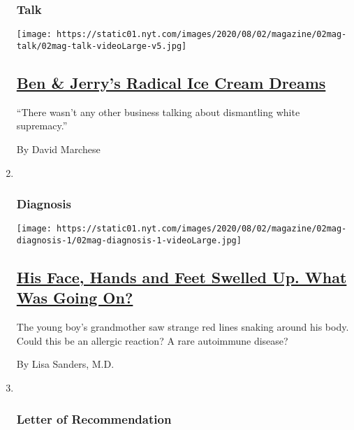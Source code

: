 \begin{enumerate}
{  \subsubsection{Talk}\label{talk-1}}

  \texttt{[image: https://static01.nyt.com/images/2020/08/02/magazine/02mag-talk/02mag-talk-videoLarge-v5.jpg]}

  \hypertarget{ben--jerrys-radical-ice-cream-dreams}{%
  \subsection{\texorpdfstring{\href{/interactive/2020/07/27/magazine/ben-jerry-interview.html}{Ben
  \& Jerry's Radical Ice Cream
  Dreams}}{Ben \& Jerry's Radical Ice Cream Dreams}}\label{ben--jerrys-radical-ice-cream-dreams}}

  ``There wasn't any other business talking about dismantling white
  supremacy.''

  By David Marchese
\item ~
  \hypertarget{diagnosis}{%
  \subsubsection{Diagnosis}\label{diagnosis}}

  \texttt{[image: https://static01.nyt.com/images/2020/08/02/magazine/02mag-diagnosis-1/02mag-diagnosis-1-videoLarge.jpg]}

  \hypertarget{his-face-hands-and-feet-swelled-up-what-was-going-on}{%
  \subsection{\texorpdfstring{\href{/2020/07/30/magazine/urticaria-multiforme.html}{His
  Face, Hands and Feet Swelled Up. What Was Going
  On?}}{His Face, Hands and Feet Swelled Up. What Was Going On?}}\label{his-face-hands-and-feet-swelled-up-what-was-going-on}}

  The young boy's grandmother saw strange red lines snaking around his
  body. Could this be an allergic reaction? A rare autoimmune disease?

  By Lisa Sanders, M.D.
\item ~
  \hypertarget{letter-of-recommendation}{%
  \subsubsection{Letter of
  Recommendation}\label{letter-of-recommendation}}


\end{enumerate}
